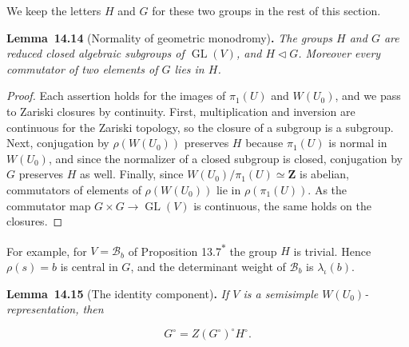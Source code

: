\documentclass[11pt]{article}
\newenvironment{bpstatement}[2]{\par\addvspace{0.6\baselineskip}\noindent\textbf{#1}#2\textbf{.}\enspace\ignorespaces}
  {\par\addvspace{0.4\baselineskip}}
\newenvironment{bpstatementit}[2]{\begin{bpstatement}{#1}{#2}\itshape\ignorespaces}{\end{bpstatement}}
\newcommand{\bpout}[1]{#1\textsuperscript{\hyperlink{bp-outside}{\ensuremath{\ast}}}}
\providecommand{\GL}{}\renewcommand{\GL}{\operatorname{GL}}
\begin{document}
\label{bp45}%
We keep the letters \(H\) and \(G\) for these two groups in the rest of this section.

\label{bp46}%
\begin{bpstatementit}{Lemma~14.14}{ (Normality of geometric monodromy)}
The groups \(H\) and \(G\) are reduced closed algebraic subgroups of \(\GL(V)\), and \(H\triangleleft G\). Moreover every commutator of two elements of \(G\) lies in \(H\).
\end{bpstatementit}

\begin{proof}[{Proof}]\label{bp47}%
Each assertion holds for the images of \(\pi_1(U)\) and \(W(U_0)\), and we pass to Zariski closures by continuity. First, multiplication and inversion are continuous for the Zariski topology, so the closure of a subgroup is a subgroup. Next, conjugation by \(\rho(W(U_0))\) preserves \(H\) because \(\pi_1(U)\) is normal in \(W(U_0)\), and since the normalizer of a closed subgroup is closed, conjugation by \(G\) preserves \(H\) as well. Finally, since \(W(U_0)/\pi_1(U)\simeq\mathbf Z\) is abelian, commutators of elements of \(\rho(W(U_0))\) lie in \(\rho(\pi_1(U))\). As the commutator map \(G\times G\to\GL(V)\) is continuous, the same holds on the closures.
\end{proof}

\label{bp48}%
For example, for \(V=\mathcal B_b\) of Proposition \bpout{13.7} the group \(H\) is trivial. Hence \(\rho(s)=b\) is central in \(G\), and the determinant weight of \(\mathcal B_b\) is \(\lambda_\iota(b)\).

\label{bp49}%
\begin{bpstatementit}{Lemma~14.15}{ (The identity component)}
If \(V\) is a semisimple \(W(U_0)\)-representation, then

\[
G^\circ=Z(G^\circ)^\circ H^\circ.
\]
\end{bpstatementit}
\end{document}
